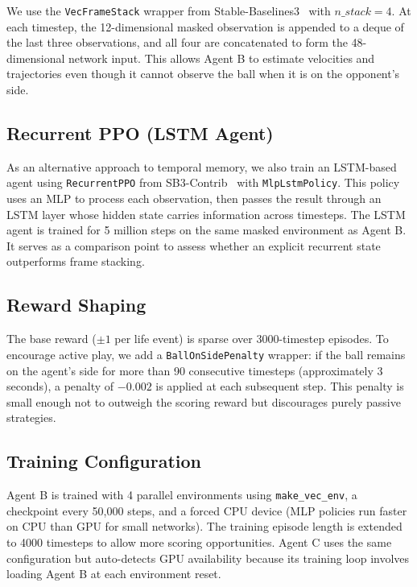 \documentclass[conference]{IEEEtran}
\begin{document}
We use the \texttt{VecFrameStack} wrapper from Stable-Baselines3~\cite{raffin2021stable} with $n\_stack = 4$. At each timestep, the 12-dimensional masked observation is appended to a deque of the last three observations, and all four are concatenated to form the 48-dimensional network input. This allows Agent B to estimate velocities and trajectories even though it cannot observe the ball when it is on the opponent's side.

\subsection{Recurrent PPO (LSTM Agent)}

As an alternative approach to temporal memory, we also train an LSTM-based agent using \texttt{RecurrentPPO} from SB3-Contrib~\cite{sb3contrib} with \texttt{MlpLstmPolicy}. This policy uses an MLP to process each observation, then passes the result through an LSTM layer whose hidden state carries information across timesteps. The LSTM agent is trained for 5 million steps on the same masked environment as Agent B. It serves as a comparison point to assess whether an explicit recurrent state outperforms frame stacking.

\subsection{Reward Shaping}

The base reward ($\pm 1$ per life event) is sparse over 3000-timestep episodes. To encourage active play, we add a \texttt{BallOnSidePenalty} wrapper: if the ball remains on the agent's side for more than 90 consecutive timesteps (approximately 3 seconds), a penalty of $-0.002$ is applied at each subsequent step. This penalty is small enough not to outweigh the scoring reward but discourages purely passive strategies.

\subsection{Training Configuration}

Agent B is trained with 4 parallel environments using \texttt{make\_vec\_env}, a checkpoint every 50,000 steps, and a forced CPU device (MLP policies run faster on CPU than GPU for small networks). The training episode length is extended to 4000 timesteps to allow more scoring opportunities. Agent C uses the same configuration but auto-detects GPU availability because its training loop involves loading Agent B at each environment reset.
\end{document}
